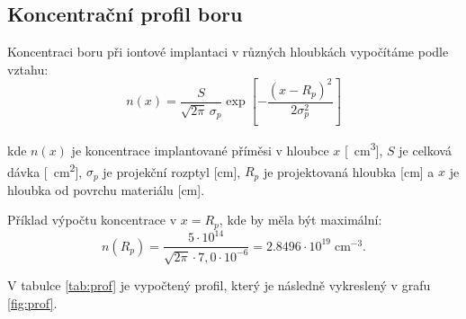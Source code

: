 \documentclass[11pt,a4paper]{article}
\begin{document}
\subsection{Koncentrační profil boru}
Koncentraci boru při iontové implantaci v různých hloubkách vypočítáme podle vztahu:
\[
n(x)=
\frac{S}{\sqrt{2\pi}\,\sigma_p}
\exp\left[
-\frac{(x-R_p)^2}{2\sigma_p^2}
\right]
\]

kde $n(x)$ je koncentrace implantované příměsi v hloubce $x$ [\si{\per\centi\meter\cubed}], $S$ je celková dávka [\si{\per\centi\meter\squared}], $\sigma_p$ je projekční rozptyl [cm], $R_p$ je projektovaná hloubka [cm] a $x$ je hloubka od povrchu materiálu [cm].

Příklad výpočtu koncentrace v $x=R_p$, kde by měla být maximální:
\[
n(R_p)=\frac{5\cdot10^{14}}{\sqrt{2\pi}\cdot7{,}0\cdot10^{-6}}
=2.8496\cdot 10^{19}\;\mathrm{cm^{-3}}.
\]

V tabulce \ref{tab:prof} je vypočtený profil, který je následně vykreslený v grafu \ref{fig:prof}.
\end{document}
